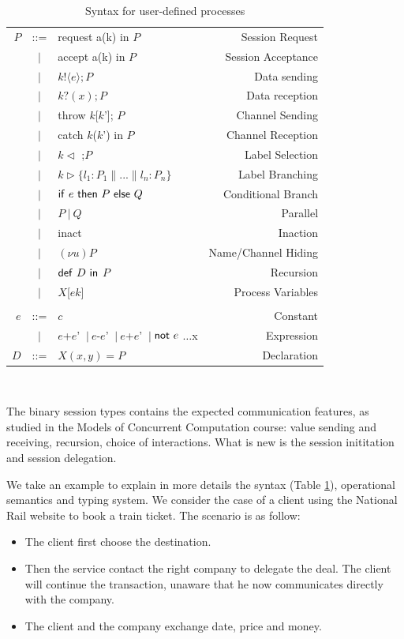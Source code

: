 \documentclass{article}
\newcommand{\ptilde}[1]{{\ensuremath{#1}}}
\newcommand{\kf}[1]{\textup{\textsf{#1}}\xspace}
\newcommand{\Ic}{\ensuremath{c}}
\newcommand{\Iu}{\ensuremath{u}}
\newcommand{\Ik}{\ensuremath{k}}
\newcommand{\PP}{\ensuremath{P}}
\newcommand{\Q}{\ensuremath{Q}}
\newcommand{\DD}{\ensuremath{D}}
\newcommand{\e}{\ensuremath{e}}
\newcommand{\x}{\ensuremath{x}}
\newcommand{\pc}{\Par}
\newcommand{\X}{\ensuremath{X}}
\newcommand{\Xsignature}{\ensuremath{\X(\at{x}, \at{y})}}
\newcommand{\Ddef}{\ensuremath{\Xsignature=\PP}}
\newcommand{\defD}{\ensuremath{\kf{def}\ \DD \ \kf{in}\ }}
\newcommand{\ifthenelse}[3]{\ensuremath{\kf{if}\ #1\ \kf{then}\ #2\ \kf{else}\ #3}}
\newcommand{\nuc}[2]{\ensuremath{(\nu #1)#2}}
\newcommand{\NOT}[1]{\ensuremath{\kf{not}\ #1}}
\newcommand{\at}[1]{\ensuremath{\ptilde{#1}}}
\newcommand{\Par}{\ensuremath{\ |\ }}
\newcommand{\sep}{\ensuremath{~\mathbf{|}~ }}
\newcommand{\outS}[3]{\ensuremath{#1!\langle #2\rangle;#3}}
\newcommand{\inpS}[3]{\ensuremath{#1?( #2);#3}}
\begin{document}
\begin{table}[tb]
\centering
\begin{tabular}{rclr}
 \PP & ::=  &  request a(k) in \PP   &   {Session Request}\\
     & \sep & accept a(k) in \PP   &   {Session Acceptance}\\
     & \sep & \outS{\Ik}\e\PP &    {Data sending}\\
     & \sep & \inpS{\Ik}\x\PP &    {Data reception}\\
     & \sep & throw \Ik[\Ik']; \PP & {Channel Sending}\\
     & \sep & catch \Ik(\Ik') in \PP &  {Channel Reception}\\
     & \sep & \Ik $\vartriangleleft$ ;{\PP} & {Label Selection}\\
     & \sep & \Ik $\vartriangleright \{  l_{1}:{\PP}_{1} \| ... \|  l_{n}:{\PP}_{n} \} $ & {Label Branching}\\[1mm]
     & \sep & \ifthenelse{\e}{\PP}{\Q} & {Conditional Branch}\\
      & \sep & \PP \pc \Q  & {Parallel}\\
      & \sep & inact & {Inaction}\\
      & \sep & \nuc{\Iu}{\PP} & {Name/Channel Hiding}\\
      & \sep & \defD \PP & {Recursion}\\
      & \sep & \X[\e\Ik] & {Process Variables}
\\
\\[2mm]
\e   & ::= & \Ic & {Constant}  \\
&  \sep & \e+\e' \sep  \e-\e' \sep \e+\e' \sep\NOT{\e} $\ldots$x
&{Expression}\\
\DD   & ::= & \Ddef &{Declaration}\\
\end{tabular}
\ \vspace{1mm}
\caption{Syntax for user-defined processes}\label{tab:syntaxB}
\end{table}

The binary session types contains the expected communication features, as studied in the Models of Concurrent Computation course: value sending and receiving, recursion, choice of interactions. What is new is the session inititation and session delegation.

We take an example to explain in more details the syntax (Table \ref{tab:syntaxB}), operational semantics and typing system.
We consider the case of a client using the National Rail website to book a train ticket. The scenario is as follow:
\begin{itemize}
\item The client first choose the destination.
\item Then the service contact the right company to delegate the deal. The client will continue the transaction, unaware that he now communicates directly with the company.
\item The client and the company exchange date, price and money.
\end{itemize}
\end{document}
